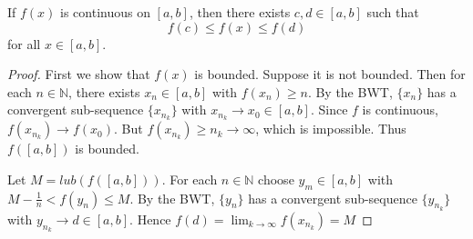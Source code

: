 \begin{thm}
If $f(x)$ is continuous on $[a,b]$, then there exists $c,d\in [a,b]$ such that \[f(c)\leq f(x) \leq f(d)\] for all $x\in [a,b]$.    
\end{thm}

\begin{proof}
First we show that $f(x)$ is bounded. Suppose it is not bounded. Then for each $n\in\mathbb{N}$, there exists $x_n\in [a,b]$ with $f(x_n)\geq n$. By the BWT, $\{x_n\}$ has a convergent sub-sequence $\{x_{n_k}\}$ with $x_{n_k} \to x_0 \in [a,b]$. Since $f$ is continuous, $f(x_{n_k})\to f(x_0)$. But $f(x_{n_k}) \geq n_k \to\infty$, which is impossible. Thus $f([a,b])$ is bounded.

Let $M = lub(f([a,b]))$. For each $n\in\mathbb{N}$ choose $y_m\in [a,b]$ with $M-\frac{1}{n} < f(y_n) \leq M$. By the BWT, $\{y_n\}$ has a convergent sub-sequence $\{y_{n_k}\}$ with $y_{n_k} \to d \in [a,b]$. Hence $f(d) = \lim_{k\to\infty} f(x_{n_k}) = M$
\end{proof}
